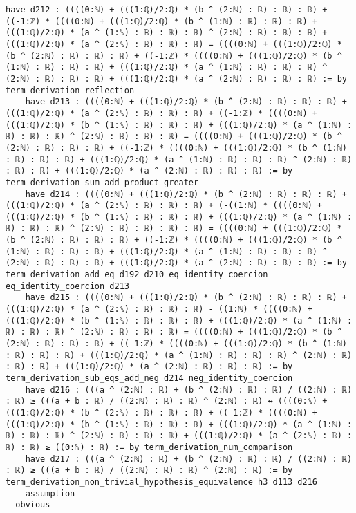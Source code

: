 \documentclass{article}
\begin{document}
\begin{tcolorbox}[colback=white!10, width=\linewidth]
\begin{lstlisting}[language=Lean4]
    have d212 : ((((0:ℕ) + (((1:ℚ)/2:ℚ) * (b ^ (2:ℕ) : ℝ) : ℝ) : ℝ) + ((-1:ℤ) * ((((0:ℕ) + (((1:ℚ)/2:ℚ) * (b ^ (1:ℕ) : ℝ) : ℝ) : ℝ) + (((1:ℚ)/2:ℚ) * (a ^ (1:ℕ) : ℝ) : ℝ) : ℝ) ^ (2:ℕ) : ℝ) : ℝ) : ℝ) + (((1:ℚ)/2:ℚ) * (a ^ (2:ℕ) : ℝ) : ℝ) : ℝ) = ((((0:ℕ) + (((1:ℚ)/2:ℚ) * (b ^ (2:ℕ) : ℝ) : ℝ) : ℝ) + ((-1:ℤ) * ((((0:ℕ) + (((1:ℚ)/2:ℚ) * (b ^ (1:ℕ) : ℝ) : ℝ) : ℝ) + (((1:ℚ)/2:ℚ) * (a ^ (1:ℕ) : ℝ) : ℝ) : ℝ) ^ (2:ℕ) : ℝ) : ℝ) : ℝ) + (((1:ℚ)/2:ℚ) * (a ^ (2:ℕ) : ℝ) : ℝ) : ℝ) := by term_derivation_reflection
    have d213 : ((((0:ℕ) + (((1:ℚ)/2:ℚ) * (b ^ (2:ℕ) : ℝ) : ℝ) : ℝ) + (((1:ℚ)/2:ℚ) * (a ^ (2:ℕ) : ℝ) : ℝ) : ℝ) + ((-1:ℤ) * ((((0:ℕ) + (((1:ℚ)/2:ℚ) * (b ^ (1:ℕ) : ℝ) : ℝ) : ℝ) + (((1:ℚ)/2:ℚ) * (a ^ (1:ℕ) : ℝ) : ℝ) : ℝ) ^ (2:ℕ) : ℝ) : ℝ) : ℝ) = ((((0:ℕ) + (((1:ℚ)/2:ℚ) * (b ^ (2:ℕ) : ℝ) : ℝ) : ℝ) + ((-1:ℤ) * ((((0:ℕ) + (((1:ℚ)/2:ℚ) * (b ^ (1:ℕ) : ℝ) : ℝ) : ℝ) + (((1:ℚ)/2:ℚ) * (a ^ (1:ℕ) : ℝ) : ℝ) : ℝ) ^ (2:ℕ) : ℝ) : ℝ) : ℝ) + (((1:ℚ)/2:ℚ) * (a ^ (2:ℕ) : ℝ) : ℝ) : ℝ) := by term_derivation_sum_add_product_greater
    have d214 : ((((0:ℕ) + (((1:ℚ)/2:ℚ) * (b ^ (2:ℕ) : ℝ) : ℝ) : ℝ) + (((1:ℚ)/2:ℚ) * (a ^ (2:ℕ) : ℝ) : ℝ) : ℝ) + (-((1:ℕ) * ((((0:ℕ) + (((1:ℚ)/2:ℚ) * (b ^ (1:ℕ) : ℝ) : ℝ) : ℝ) + (((1:ℚ)/2:ℚ) * (a ^ (1:ℕ) : ℝ) : ℝ) : ℝ) ^ (2:ℕ) : ℝ) : ℝ) : ℝ) : ℝ) = ((((0:ℕ) + (((1:ℚ)/2:ℚ) * (b ^ (2:ℕ) : ℝ) : ℝ) : ℝ) + ((-1:ℤ) * ((((0:ℕ) + (((1:ℚ)/2:ℚ) * (b ^ (1:ℕ) : ℝ) : ℝ) : ℝ) + (((1:ℚ)/2:ℚ) * (a ^ (1:ℕ) : ℝ) : ℝ) : ℝ) ^ (2:ℕ) : ℝ) : ℝ) : ℝ) + (((1:ℚ)/2:ℚ) * (a ^ (2:ℕ) : ℝ) : ℝ) : ℝ) := by term_derivation_add_eq d192 d210 eq_identity_coercion eq_identity_coercion d213
    have d215 : ((((0:ℕ) + (((1:ℚ)/2:ℚ) * (b ^ (2:ℕ) : ℝ) : ℝ) : ℝ) + (((1:ℚ)/2:ℚ) * (a ^ (2:ℕ) : ℝ) : ℝ) : ℝ) - ((1:ℕ) * ((((0:ℕ) + (((1:ℚ)/2:ℚ) * (b ^ (1:ℕ) : ℝ) : ℝ) : ℝ) + (((1:ℚ)/2:ℚ) * (a ^ (1:ℕ) : ℝ) : ℝ) : ℝ) ^ (2:ℕ) : ℝ) : ℝ) : ℝ) = ((((0:ℕ) + (((1:ℚ)/2:ℚ) * (b ^ (2:ℕ) : ℝ) : ℝ) : ℝ) + ((-1:ℤ) * ((((0:ℕ) + (((1:ℚ)/2:ℚ) * (b ^ (1:ℕ) : ℝ) : ℝ) : ℝ) + (((1:ℚ)/2:ℚ) * (a ^ (1:ℕ) : ℝ) : ℝ) : ℝ) ^ (2:ℕ) : ℝ) : ℝ) : ℝ) + (((1:ℚ)/2:ℚ) * (a ^ (2:ℕ) : ℝ) : ℝ) : ℝ) := by term_derivation_sub_eqs_add_neg d214 neg_identity_coercion
    have d216 : (((a ^ (2:ℕ) : ℝ) + (b ^ (2:ℕ) : ℝ) : ℝ) / ((2:ℕ) : ℝ) : ℝ) ≥ (((a + b : ℝ) / ((2:ℕ) : ℝ) : ℝ) ^ (2:ℕ) : ℝ) ↔ ((((0:ℕ) + (((1:ℚ)/2:ℚ) * (b ^ (2:ℕ) : ℝ) : ℝ) : ℝ) + ((-1:ℤ) * ((((0:ℕ) + (((1:ℚ)/2:ℚ) * (b ^ (1:ℕ) : ℝ) : ℝ) : ℝ) + (((1:ℚ)/2:ℚ) * (a ^ (1:ℕ) : ℝ) : ℝ) : ℝ) ^ (2:ℕ) : ℝ) : ℝ) : ℝ) + (((1:ℚ)/2:ℚ) * (a ^ (2:ℕ) : ℝ) : ℝ) : ℝ) ≥ ((0:ℕ) : ℝ) := by term_derivation_num_comparison
    have d217 : (((a ^ (2:ℕ) : ℝ) + (b ^ (2:ℕ) : ℝ) : ℝ) / ((2:ℕ) : ℝ) : ℝ) ≥ (((a + b : ℝ) / ((2:ℕ) : ℝ) : ℝ) ^ (2:ℕ) : ℝ) := by term_derivation_non_trivial_hypothesis_equivalence h3 d113 d216
    assumption
  obvious

\end{lstlisting}
\end{tcolorbox}
\end{document}
